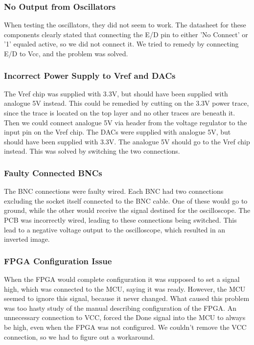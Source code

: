 \subsubsection{No Output from Oscillators}
When testing the oscillators, they did not seem to work. The datasheet for these components clearly stated that connecting the E/D pin to either 'No Connect' or '1' equaled active, so we did not connect it. We tried to remedy by connecting E/D to Vcc, and the problem was solved.

\subsubsection{Incorrect Power Supply to Vref and DACs}
The Vref chip was supplied with 3.3V, but should have been supplied with analogue 5V instead. This could be remedied by cutting on the 3.3V power trace, since the trace is located on the top layer and no other traces are beneath it. Then we could connect analogue 5V via header from the voltage regulator to the input pin on the Vref chip.
\newline
The DACs were supplied with analogue 5V, but should have been supplied with 3.3V. The analogue 5V should go to the Vref chip instead. This was solved by switching the two connections.

\subsubsection{Faulty Connected BNCs}
The BNC connections were faulty wired. Each BNC had two connections excluding the socket itself connected to the BNC cable. One of these would go to ground, while the other would receive the signal destined for the oscilloscope. The PCB was incorrectly wired, leading to these connections being switched. This lead to a negative voltage output to the oscilloscope, which resulted in an inverted image. 

\subsubsection{FPGA Configuration Issue}
When the FPGA would complete configuration it was supposed to set a signal high, which was connected to the MCU, saying it was ready. However, the MCU seemed to ignore this signal, because it never changed. What caused this problem was too hasty study of the manual describing configuration of the FPGA.
An unnecessary connection to VCC, forced the Done signal into the MCU to always be high, even when the FPGA was not configured. We couldn't remove the VCC connection, so we had to figure out a workaround.

